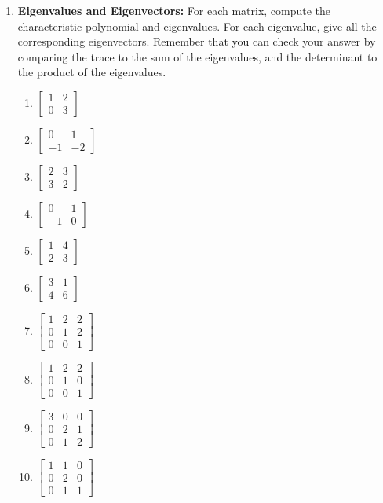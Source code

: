 \begin{enumerate}
\item \textbf{Eigenvalues and Eigenvectors:} For each matrix, compute the characteristic polynomial and eigenvalues. For each eigenvalue, give all the corresponding eigenvectors. Remember that you can check your answer by comparing the trace to the sum of the eigenvalues, and the determinant to the product of the eigenvalues.
\begin{multicols}{4}
\begin{enumerate}
	\item 
$
\begin{bmatrix}
 1 & 2 \\
 0 & 3
\end{bmatrix}
$
	\item 
$
\begin{bmatrix}
 0 & 1 \\
 -1 & -2
\end{bmatrix}
$
	\item 
$
\begin{bmatrix}
 2 & 3 \\
 3 & 2
\end{bmatrix}
$
	\item 
$
\begin{bmatrix}
 0 & 1 \\
 -1 & 0
\end{bmatrix}
$
	\item 
$
\begin{bmatrix}
 1 & 4 \\
 2 & 3
\end{bmatrix}
$
	\item 
$
\begin{bmatrix}
 3 & 1 \\
 4 & 6
\end{bmatrix}
$
	\item 
$
\begin{bmatrix}
 1 & 2 & 2 \\
 0 & 1 & 2 \\
 0 & 0 & 1
\end{bmatrix}
$
	\item 
$
\begin{bmatrix}
 1 & 2 & 2 \\
 0 & 1 & 0 \\
 0 & 0 & 1
\end{bmatrix}
$
	\item 
$
\begin{bmatrix}
 3 & 0 & 0 \\
 0 & 2 & 1 \\
 0 & 1 & 2
\end{bmatrix}
$
	\item 
$
\begin{bmatrix}
 1 & 1 & 0 \\
 0 & 2 & 0 \\
 0 & 1 & 1
\end{bmatrix}
$
\end{enumerate}
\end{multicols}
 

\end{enumerate}
